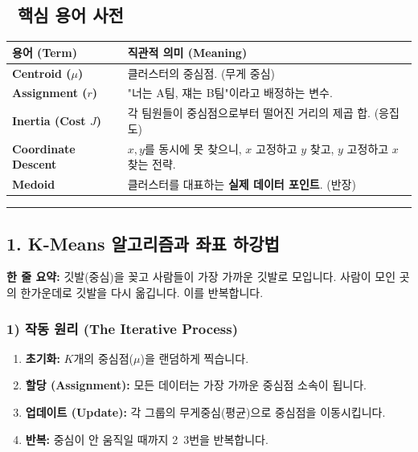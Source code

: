 \documentclass[11pt,a4paper]{book}
\theoremstyle{definition}
\begin{document}
\subsection*{📝 핵심 용어 사전}
\begin{table}[h]
\centering
\begin{tabularx}{\textwidth}{|p{}|X|}
\hline
\textbf{용어 (Term)} & \textbf{직관적 의미 (Meaning)} \\
\hline
\textbf{Centroid ($\mu$)} & 클러스터의 중심점. (무게 중심) \\
\hline
\textbf{Assignment ($r$)} & "너는 A팀, 쟤는 B팀"이라고 배정하는 변수. \\
\hline
\textbf{Inertia (Cost $J$)} & 각 팀원들이 중심점으로부터 떨어진 거리의 제곱 합. (응집도) \\
\hline
\textbf{Coordinate Descent} & $x, y$를 동시에 못 찾으니, $x$ 고정하고 $y$ 찾고, $y$ 고정하고 $x$ 찾는 전략. \\
\hline
\textbf{Medoid} & 클러스터를 대표하는 \textbf{실제 데이터 포인트}. (반장) \\
\hline
\end{tabularx}
\end{table}

\vspace{0.5cm}\hrule\vspace{0.5cm}

\subsection{1. K-Means 알고리즘과 좌표 하강법}


\begin{conceptbox}[title={개념 1: 깃발 꽂기 게임}]
\textbf{한 줄 요약:} 깃발(중심)을 꽂고 사람들이 가장 가까운 깃발로 모입니다. 사람이 모인 곳의 한가운데로 깃발을 다시 옮깁니다. 이를 반복합니다.
\end{conceptbox}

\subsubsection*{1) 작동 원리 (The Iterative Process)}
\begin{enumerate}
    \item \textbf{초기화:} $K$개의 중심점($\mu$)을 랜덤하게 찍습니다.
    \item \textbf{할당 (Assignment):} 모든 데이터는 가장 가까운 중심점 소속이 됩니다.
    \item \textbf{업데이트 (Update):} 각 그룹의 무게중심(평균)으로 중심점을 이동시킵니다.
    \item \textbf{반복:} 중심이 안 움직일 때까지 2~3번을 반복합니다.
\end{enumerate}
\end{document}
